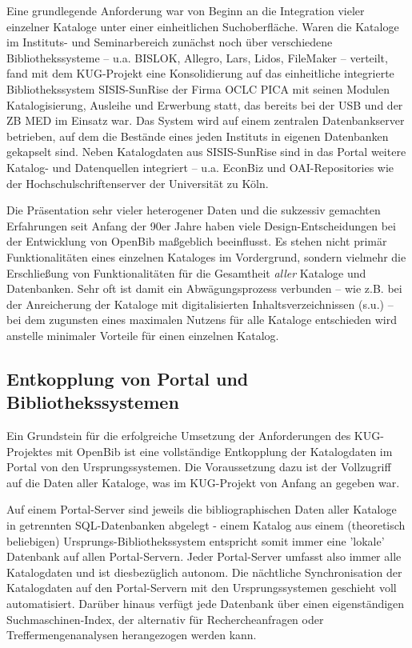 \documentclass[11pt]{scrartcl}
\begin{document}
Eine grundlegende Anforderung war von Beginn an die Integration vieler
einzelner Kataloge unter einer einheitlichen Suchoberfläche. Waren die
Kataloge im Instituts- und Seminarbereich zunächst noch über
verschiedene Bibliothekssysteme -- u.a. BISLOK, Allegro, Lars, Lidos,
FileMaker -- verteilt, fand mit dem KUG-Projekt eine Konsolidierung
auf das einheitliche integrierte Bibliothekssystem SISIS-SunRise der
Firma OCLC PICA mit seinen Modulen Katalogisierung, Ausleihe und
Erwerbung statt, das bereits bei der USB und der ZB MED im Einsatz
war. Das System wird auf einem zentralen Datenbankserver betrieben,
auf dem die Bestände eines jeden Instituts in eigenen Datenbanken
gekapselt sind. Neben Katalogdaten aus SISIS-SunRise sind in das
Portal weitere Katalog- und Datenquellen integriert -- u.a. EconBiz und
OAI-Repositories wie der Hochschulschriftenserver der Universität zu
Köln.

Die Präsentation sehr vieler heterogener Daten und die sukzessiv
gemachten Erfahrungen seit Anfang der 90er Jahre haben viele
Design-Entscheidungen bei der Entwicklung von OpenBib maßgeblich
beeinflusst. Es stehen nicht primär Funktionalitäten eines einzelnen
Kataloges im Vordergrund, sondern vielmehr die Erschließung von
Funktionalitäten für die Gesamtheit \emph{aller} Kataloge und Datenbanken.
Sehr oft ist damit ein Abwägungsprozess verbunden -- wie z.B. bei der
Anreicherung der Kataloge mit digitalisierten Inhaltsverzeichnissen
(s.u.) -- bei dem zugunsten eines maximalen Nutzens für alle Kataloge
entschieden wird anstelle minimaler Vorteile für einen einzelnen
Katalog.

\subsection{Entkopplung von Portal und Bibliothekssystemen}
Ein Grundstein für die erfolgreiche Umsetzung der Anforderungen des
KUG-Projektes mit OpenBib ist eine vollständige Entkopplung der
Katalogdaten im Portal von den Ursprungssystemen. Die Voraussetzung
dazu ist der Vollzugriff auf die Daten aller Kataloge, was im
KUG-Projekt von Anfang an gegeben war.

Auf einem Portal-Server sind jeweils die bibliographischen Daten aller
Kataloge in getrennten SQL-Datenbanken abgelegt - einem Katalog aus
einem (theoretisch beliebigen) Ursprungs-Bibliothekssystem entspricht
somit immer eine 'lokale' Datenbank auf allen Portal-Servern. Jeder
Portal-Server umfasst also immer alle Katalogdaten und ist
diesbezüglich autonom. Die nächtliche Synchronisation der Katalogdaten
auf den Portal-Servern mit den Ursprungssystemen geschieht voll
automatisiert. Darüber hinaus verfügt jede Datenbank über einen
eigenständigen Suchmaschinen-Index, der alternativ für
Rechercheanfragen oder Treffermengenanalysen herangezogen werden kann.
\end{document}
